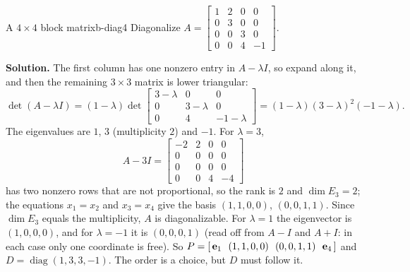 \documentclass[11pt]{article}
\begin{document}
\begin{exmp}{A $4\times4$ block matrix}{b-diag4}
Diagonalize $A=\begin{bmatrix}1&2&0&0\\0&3&0&0\\0&0&3&0\\0&0&4&-1\end{bmatrix}$.

\textbf{Solution.} The first column has one nonzero entry in $A-\lambda I$, so expand along it, and then the remaining $3\times3$ matrix is lower triangular:
\[
\det(A-\lambda I)=(1-\lambda)\det\begin{bmatrix}3-\lambda&0&0\\0&3-\lambda&0\\0&4&-1-\lambda\end{bmatrix}=(1-\lambda)(3-\lambda)^2(-1-\lambda).
\]
The eigenvalues are $1$, $3$ (multiplicity $2$) and $-1$. For $\lambda=3$,
\[
A-3I=\begin{bmatrix}-2&2&0&0\\0&0&0&0\\0&0&0&0\\0&0&4&-4\end{bmatrix}
\]
has two nonzero rows that are not proportional, so the rank is $2$ and $\dim E_3=2$; the equations $x_1=x_2$ and $x_3=x_4$ give the basis $(1,1,0,0)$, $(0,0,1,1)$. Since $\dim E_3$ equals the multiplicity, $A$ is diagonalizable. For $\lambda=1$ the eigenvector is $(1,0,0,0)$, and for $\lambda=-1$ it is $(0,0,0,1)$ (read off from $A-I$ and $A+I$: in each case only one coordinate is free). So $P=[\,\bv{e}_1\ \ (1,1,0,0)\ \ (0,0,1,1)\ \ \bv{e}_4\,]$ and $D=\operatorname{diag}(1,3,3,-1)$. The order is a choice, but $D$ must follow it.
\end{exmp}
\end{document}

